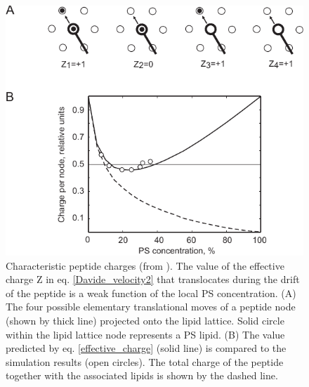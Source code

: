 \begin{figure}[!ht]
\begin{center}
  \includegraphics[scale=1.2]{../figures/effective_peptide_charge.pdf}
\end{center}
 \caption[Characteristic peptide charges]{Characteristic peptide charges (from \cite{Kiselev2011}). The value of the effective charge Z in eq. \eqref{Davide_velocity2} that translocates during the drift of the peptide is a weak function of the local PS concentration. (A) The four possible elementary translational moves of a peptide node (shown by thick line) projected onto the lipid lattice. Solid circle within the lipid lattice node represents a PS lipid. (B) The value predicted by eq. \eqref{effective_charge} (solid line) is compared to the simulation results (open circles). The total charge of the peptide together with the associated lipids is shown by the dashed line.}
\label{fig:effective_peptide_charge}
\end{figure}
